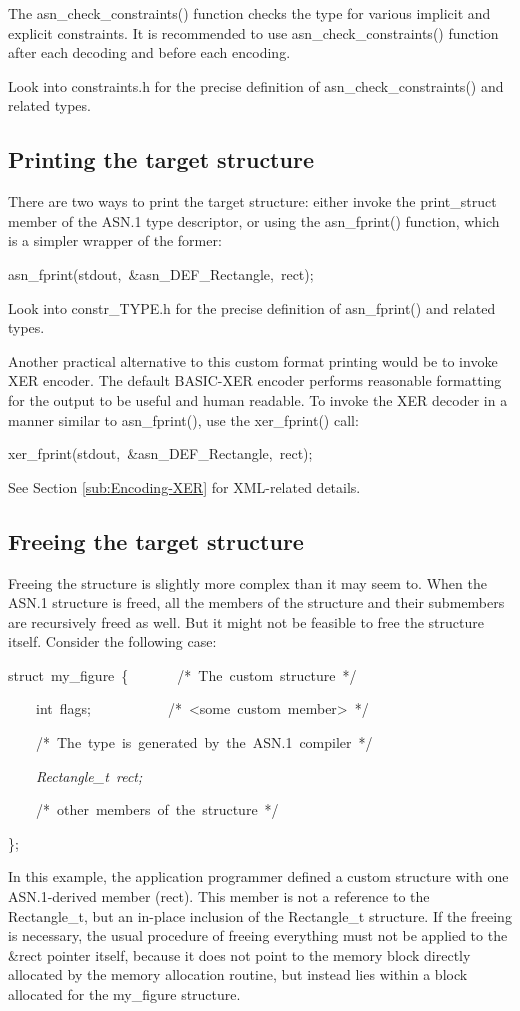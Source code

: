\documentclass[english,oneside,12pt]{book}
\newenvironment{lyxcode}
{\par\begin{list}{}{
\setlength{\rightmargin}{\leftmargin}
\setlength{\listparindent}{0pt}%
\raggedright
\setlength{\itemsep}{0pt}
\setlength{\parsep}{0pt}
\normalfont\ttfamily}%
 \item[]}
{\end{list}}
\begin{document}
The asn\_check\_constraints() function checks the type for various
implicit and explicit constraints. It is recommended to use asn\_check\_constraints()
function after each decoding and before each encoding.

Look into constraints.h for the precise definition of asn\_check\_constraints()
and related types.


\subsection{\label{sub:Printing-the-target}Printing the target structure}

There are two ways to print the target structure: either invoke the
print\_struct member of the ASN.1 type descriptor, or using the asn\_fprint()
function, which is a simpler wrapper of the former:
\begin{lyxcode}
asn\_fprint(stdout,~\&asn\_DEF\_Rectangle,~rect);
\end{lyxcode}
Look into constr\_TYPE.h for the precise definition of asn\_fprint()
and related types.

Another practical alternative to this custom format printing would
be to invoke XER encoder. The default BASIC-XER encoder performs reasonable
formatting for the output to be useful and human readable. To invoke
the XER decoder in a manner similar to asn\_fprint(), use the xer\_fprint()
call:
\begin{lyxcode}
xer\_fprint(stdout,~\&asn\_DEF\_Rectangle,~rect);
\end{lyxcode}
See Section \vref{sub:Encoding-XER} for XML-related details.


\subsection{\label{sub:Freeing-the-target}Freeing the target structure}

Freeing the structure is slightly more complex than it may seem to.
When the ASN.1 structure is freed, all the members of the structure
and their submembers are recursively freed as well. But it might not
be feasible to free the structure itself. Consider the following case:
\begin{lyxcode}
struct~my\_figure~\{~~~~~~~/{*}~The~custom~structure~{*}/

~~~~int~flags;~~~~~~~~~~~/{*}~<some~custom~member>~{*}/

~~~~/{*}~The~type~is~generated~by~the~ASN.1~compiler~{*}/

~~~~\emph{Rectangle\_t~rect;}

~~~~/{*}~other~members~of~the~structure~{*}/

\};
\end{lyxcode}
In this example, the application programmer defined a custom structure
with one ASN.1-derived member (rect). This member is not a reference
to the Rectangle\_t, but an in-place inclusion of the Rectangle\_t
structure. If the freeing is necessary, the usual procedure of freeing
everything must not be applied to the \&rect pointer itself, because
it does not point to the memory block directly allocated by the memory
allocation routine, but instead lies within a block allocated for
the my\_figure structure.
\end{document}
